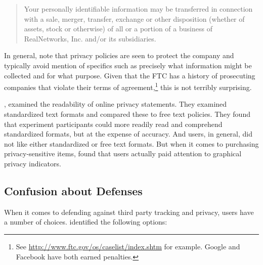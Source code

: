 \begin{quote}
Your personally identifiable information may be transferred in connection with a sale, merger, transfer, exchange or other disposition (whether of assets, stock or otherwise) of all or a portion of a business of RealNetworks, Inc. and/or its subsidiaries. \citep{Fernback:2007bq}
\end{quote}

In general,  \cite{Fernback:2007bq}  note that privacy policies are seen to protect the company and typically avoid mention of specifics such as precisely what information might be collected and for what purpose. Given that the FTC has a history of prosecuting companies that violate their terms of  agreement,\footnote{See \url{http://www.ftc.gov/os/caselist/index.shtm} for example. Google and Facebook have both earned penalties.}  this is not terribly surprising. 

 \cite*{McDonald:2009vz},  examined the readability of online privacy statements. They examined standardized text formats and compared these to free text policies. They found that experiment participants could more readily read and comprehend standardized formats, but at the expense of accuracy. And users, in general, did not like either standardized or free text formats. But when it comes to purchasing privacy-sensitive items,  \cite*{Egelman:2009ut}  found that users actually paid attention to graphical privacy indicators.

\subsection{Confusion about Defenses}
\label{confusionaboutdefenses}

When it comes to defending against third party tracking and privacy, users have a number of choices.  \cite{Roesner:2012uj}  identified the following options:

